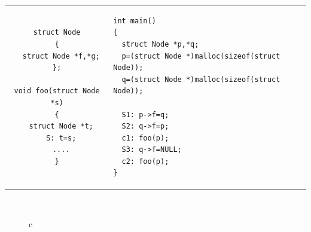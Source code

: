 \begin{tabular}[t]{cl}
\begin{lstlisting}
struct Node
{
  struct Node *f,*g;
};

void foo(struct Node *s)
{
  struct Node *t;
  S: t=s;
  ....
}
\end{lstlisting}
&
\begin{lstlisting}
int main()
{
  struct Node *p,*q;
  p=(struct Node *)malloc(sizeof(struct Node));
  q=(struct Node *)malloc(sizeof(struct Node));

  S1: p->f=q;
  S2: q->f=p;
  c1: foo(p);
  S3: q->f=NULL;
  c2: foo(p);
}
\end{lstlisting}
\end{tabular}
\\ 
\begin{figure}[h]
\begin{tabular}{c}
  \\


\end{tabular}
\end{figure}
